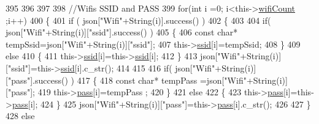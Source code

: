 \begin{DoxyCode}
395 
396             
397             
398             \textcolor{comment}{//Wifis SSID and PASS}
399             \textcolor{keywordflow}{for}(\textcolor{keywordtype}{int} i =0; i<this->\hyperlink{classCoolWifi_ab133bd92fcb895b884deecd6678592e4}{wifiCount} ;i++)
400             \{
401                 \textcolor{keywordflow}{if} ( json[\textcolor{stringliteral}{"Wifi"}+String(i)].success() )
402                 \{
403                     
404                     \textcolor{keywordflow}{if}( json[\textcolor{stringliteral}{"Wifi"}+String(i)][\textcolor{stringliteral}{"ssid"}].success() )
405                     \{
406                         \textcolor{keyword}{const} \textcolor{keywordtype}{char}* tempSsid=json[\textcolor{stringliteral}{"Wifi"}+String(i)][\textcolor{stringliteral}{"ssid"}]; 
407                         this->\hyperlink{classCoolWifi_a893b21d0fed821438733bba2e73fb4c2}{ssid}[i]=tempSsid;                 
408                     \}
409                     \textcolor{keywordflow}{else}
410                     \{
411                         this->\hyperlink{classCoolWifi_a893b21d0fed821438733bba2e73fb4c2}{ssid}[i]=this->\hyperlink{classCoolWifi_a893b21d0fed821438733bba2e73fb4c2}{ssid}[i];                    
412                     \}
413                     json[\textcolor{stringliteral}{"Wifi"}+String(i)][\textcolor{stringliteral}{"ssid"}]=this->\hyperlink{classCoolWifi_a893b21d0fed821438733bba2e73fb4c2}{ssid}[i].c\_str();
414                     
415                     
416                     \textcolor{keywordflow}{if}( json[\textcolor{stringliteral}{"Wifi"}+String(i)][\textcolor{stringliteral}{"pass"}].success() )
417                     \{
418                         \textcolor{keyword}{const} \textcolor{keywordtype}{char}* tempPass =json[\textcolor{stringliteral}{"Wifi"}+String(i)][\textcolor{stringliteral}{"pass"}];
419                         this->\hyperlink{classCoolWifi_a0c3332a149245aaad060b32593a54c9b}{pass}[i]=tempPass ;                    
420                     \}
421                     \textcolor{keywordflow}{else}
422                     \{
423                         this->\hyperlink{classCoolWifi_a0c3332a149245aaad060b32593a54c9b}{pass}[i]=this->\hyperlink{classCoolWifi_a0c3332a149245aaad060b32593a54c9b}{pass}[i];                    
424                     \}
425                     json[\textcolor{stringliteral}{"Wifi"}+String(i)][\textcolor{stringliteral}{"pass"}]=this->\hyperlink{classCoolWifi_a0c3332a149245aaad060b32593a54c9b}{pass}[i].c\_str();           
426                 
427                 \}
428                 \textcolor{keywordflow}{else}

\end{DoxyCode}
